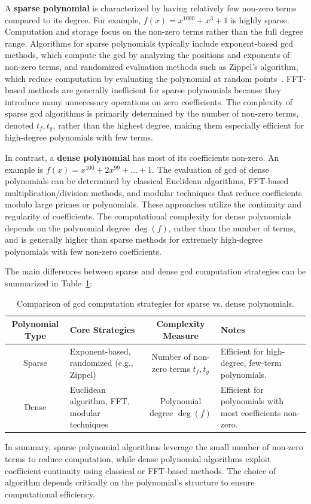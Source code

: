 \documentclass[11pt]{article}
\begin{document}
A \textbf{sparse polynomial} is characterized by having relatively few non-zero terms compared to its degree. For example, \(f(x) = x^{1000} + x^3 + 1\) is highly sparse. Computation and storage focus on the non-zero terms rather than the full degree range. Algorithms for sparse polynomials typically include exponent-based gcd methods, which compute the gcd by analyzing the positions and exponents of non-zero terms, and randomized evaluation methods such as Zippel's algorithm, which reduce computation by evaluating the polynomial at random points~\cite{zippel1981newton}. FFT-based methods are generally inefficient for sparse polynomials because they introduce many unnecessary operations on zero coefficients. The complexity of sparse gcd algorithms is primarily determined by the number of non-zero terms, denoted \(t_f, t_g\), rather than the highest degree, making them especially efficient for high-degree polynomials with few terms.

In contrast, a \textbf{dense polynomial} has most of its coefficients non-zero. An example is \(f(x) = x^{100} + 2x^{99} + \dots + 1\). The evaluation of gcd of dense polynomials can be determined by classical Euclidean algorithms, FFT-based multiplication/division methods, and modular techniques that reduce coefficients modulo large primes or polynomials. These approaches utilize the continuity and regularity of coefficients. The computational complexity for dense polynomials depends on the polynomial degree  $\deg(f)$, rather than the number of terms, and is generally higher than sparse methods for extremely high-degree polynomials with few non-zero coefficients.

The main differences between sparse and dense gcd computation strategies can be summarized in Table~\ref{tab:gcd_sparse_dense}:

\begin{table}[h!]
\centering
\footnotesize
\setlength{\tabcolsep}{3pt}
\renewcommand{\arraystretch}{1.2}
\begin{tabularx}{\columnwidth}{|c|X|c|X|}
\hline
\textbf{Polynomial Type} & \textbf{Core Strategies} & \textbf{Complexity Measure} & \textbf{Notes} \\
\hline
Sparse & Exponent-based, randomized (e.g., Zippel) & Number of non-zero terms \(t_f, t_g\) & Efficient for high-degree, few-term polynomials. \\
\hline
Dense & Euclidean algorithm, FFT, modular techniques & Polynomial degree \(\deg(f)\) & Efficient for polynomials with most coefficients non-zero. \\
\hline
\end{tabularx}
\caption{Comparison of gcd computation strategies for sparse vs. dense polynomials.}
\label{tab:gcd_sparse_dense}
\end{table}

In summary, sparse polynomial algorithms leverage the small number of non-zero terms to reduce computation, while dense polynomial algorithms exploit coefficient continuity using classical or FFT-based methods. The choice of algorithm depends critically on the polynomial's structure to ensure computational efficiency.




\end{document}
